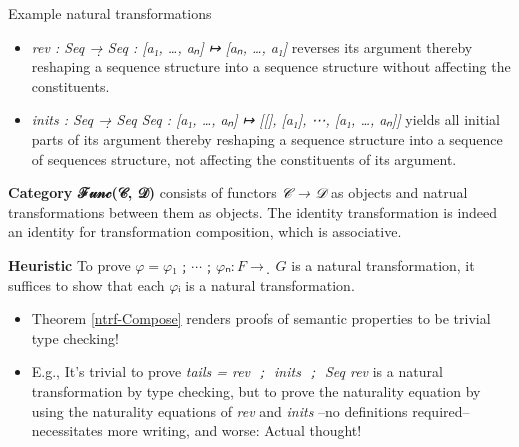 \documentclass[11pt]{article}
\begin{document}
\room

Example natural transformations
\begin{itemize}
\item \emph{rev : Seq →̣ Seq : [a₁, …, aₙ] ↦ [aₙ, …, a₁]}
reverses its argument thereby reshaping a sequence structure into a sequence structure without affecting the constituents.

\item \emph{inits : Seq →̣ Seq Seq : [a₁, …, aₙ] ↦ [[], [a₁], ⋯, [a₁, …, aₙ]]}
yields all initial parts of its argument
thereby reshaping a sequence structure into a sequence of sequences structure, not affecting
the constituents of its argument.
\end{itemize}

\room

\begineqns





\endeqns

\room

\textbf{Category ℱ𝓊𝓃𝒸(𝒞, 𝒟)}
consists of functors \emph{𝒞 → 𝒟} as objects and natrual transformations between them as objects.
The identity transformation is indeed an identity for transformation composition, which is associative. 

\room

\textbf{Heuristic} To prove \(φ = φ₁ ﹔ ⋯ ﹔ φₙ : F →̣ G\) is a natural transformation, it suffices
to show that each \(φᵢ\) is a natural transformation.
\begin{itemize}
\item Theorem \eqref{ntrf-Compose} renders proofs of semantic properties to be trivial type checking!
\item E.g., It's trivial to prove \emph{tails = rev ﹔ inits ﹔ Seq rev} is a natural transformation
by type checking, but to prove the naturality equation by using the naturality equations of
\emph{rev} and \emph{inits} --no definitions required-- necessitates more writing, and worse: Actual thought!
\end{itemize}
\end{document}
